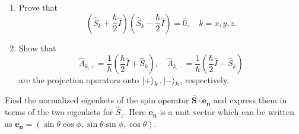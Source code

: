 \documentclass[12pt]{article}
\newenvironment{problem}[2][Problem]{\begin{trivlist}
    \item[\hskip \labelsep {\bfseries #1}\hskip \labelsep {\bfseries #2.}]}{\end{trivlist}}
\theoremstyle{definition}
\begin{document}
\begin{problem}{4}\hfill
  \begin{enumerate}[label=(\alph*)]

    \item Prove that
          \begin{equation}
            \label{eq:6}
            \left( \hat{S}_k + \frac{\hbar}{2} \hat{I} \right)\left( \hat{S}_k - \frac{\hbar}{2} \hat{I} \right) = \hat{0}, \quad k=x,y,z.
          \end{equation}
    \item Show that
          \begin{equation}
          \label{eq:7}
          \hat{\Lambda}_{k,+} = \frac{1}{\hbar} \left( \frac{\hbar}{2} \hat{I} + \hat{S}_k \right), \quad \hat{\Lambda}_{k, -} = \frac{1}{\hbar} \left( \frac{\hbar}{2} \hat{I} - \hat{S}_k \right)
        \end{equation}
          are the projection operators onto \( \ket{+}_k, \ket{-}_k \), respectively.
  \end{enumerate}
\end{problem}

\begin{problem}{5}
  Find the normalized eigenkets of the spin operator \( \mathbf{\hat{S}} \cdot \mathbf{e_n} \) and express them in terms of the two eigenkets for \( \hat{S}_{z} \).
  Here \( \mathbf{e_n} \) is a unit vector which can be written as \( \mathbf{e_n} = (\sin\theta\cos\phi, \sin\theta\sin\phi, \cos\theta) \).
\end{problem}
\end{document}
